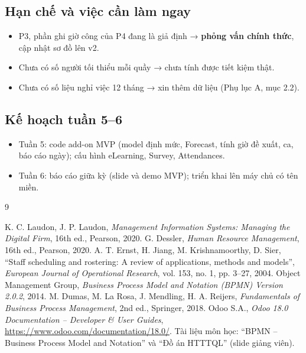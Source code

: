 \documentclass[12pt,a4paper,oneside]{report}
\begin{document}
\subsection{Hạn chế và việc cần làm ngay}
\begin{itemize}
\item P3, phần ghi giờ công của P4 đang là giả định → \textbf{phỏng vấn chính thức}, cập nhật sơ đồ lên v2.
\item Chưa có số người tối thiểu mỗi quầy → chưa tính được tiết kiệm thật.
\item Chưa có số liệu nghỉ việc 12 tháng → xin thêm dữ liệu (Phụ lục A, mục 2.2).
\end{itemize}
\subsection{Kế hoạch tuần 5–6}
\begin{itemize}
\item Tuần 5: code add-on MVP (model định mức, Forecast, tính giờ đề xuất, ca, báo cáo ngày); cấu hình eLearning, Survey, Attendances.
\item Tuần 6: báo cáo giữa kỳ (slide và demo MVP); triển khai lên máy chủ có tên miền.
\end{itemize}

\begin{thebibliography}{9}
 K. C. Laudon, J. P. Laudon, \emph{Management Information Systems: Managing the Digital Firm}, 16th ed., Pearson, 2020.
 G. Dessler, \emph{Human Resource Management}, 16th ed., Pearson, 2020.
 A. T. Ernst, H. Jiang, M. Krishnamoorthy, D. Sier, ``Staff scheduling and rostering: A review of applications, methods and models'', \emph{European Journal of Operational Research}, vol. 153, no. 1, pp. 3–27, 2004.
 Object Management Group, \emph{Business Process Model and Notation (BPMN) Version 2.0.2}, 2014.
 M. Dumas, M. La Rosa, J. Mendling, H. A. Reijers, \emph{Fundamentals of Business Process Management}, 2nd ed., Springer, 2018.
 Odoo S.A., \emph{Odoo 18.0 Documentation – Developer \& User Guides}, \url{https://www.odoo.com/documentation/18.0/}.
 Tài liệu môn học: ``BPMN – Business Process Model and Notation'' và ``Đồ án HTTTQL'' (slide giảng viên).
\end{thebibliography}

\appendix
{}
\end{document}
